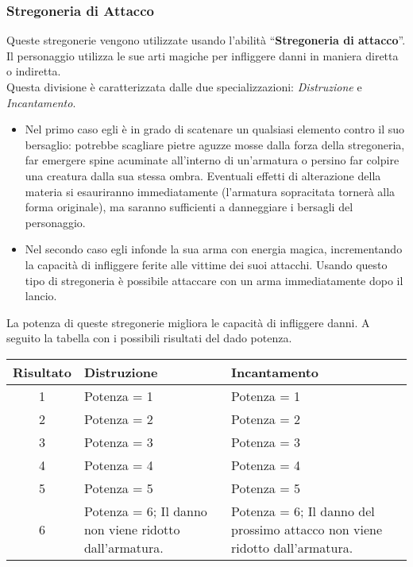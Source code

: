 \documentclass[../manuale_main.tex]{subfiles}
\begin{document}
\subsubsection{Stregoneria di Attacco}
Queste stregonerie vengono utilizzate usando l'abilità ``\textbf{Stregoneria di attacco}''.\\
Il personaggio utilizza le sue arti magiche per infliggere danni in maniera diretta o indiretta. \\
Questa divisione è caratterizzata dalle due specializzazioni: \emph{Distruzione} e \emph{Incantamento}.\\
\begin{itemize}
\item Nel primo caso egli è in grado di scatenare un qualsiasi elemento contro il suo bersaglio: potrebbe scagliare pietre aguzze mosse dalla forza della stregoneria, far emergere spine acuminate all'interno di un'armatura o persino far colpire una creatura dalla sua stessa ombra. Eventuali effetti di alterazione della materia si esauriranno immediatamente (l'armatura sopracitata tornerà alla forma originale), ma saranno sufficienti a danneggiare i bersagli del personaggio.
\item Nel secondo caso egli infonde la sua arma con energia magica, incrementando la capacità di infliggere ferite alle vittime dei suoi attacchi. Usando questo tipo di stregoneria è possibile attaccare con un arma immediatamente dopo il lancio.
\end{itemize}
La potenza di queste stregonerie migliora le capacità di infliggere danni. A seguito la tabella con i possibili risultati del dado potenza.\\

\begin{tabularx}{\linewidth}{|c |X| X|}
\hline
\textbf{Risultato}&\textbf{Distruzione}&\textbf{Incantamento}\\ \hline
1&Potenza = 1&Potenza = 1\\ \hline
2&Potenza = 2&Potenza = 2\\ \hline
3&Potenza = 3&Potenza = 3\\ \hline
4&Potenza = 4&Potenza = 4\\ \hline
5&Potenza = 5&Potenza = 5\\ \hline
6&Potenza = 6; Il danno non viene ridotto dall'armatura. &Potenza = 6; Il danno del prossimo attacco non viene ridotto dall'armatura.\\ \hline
\end{tabularx}
\end{document}
